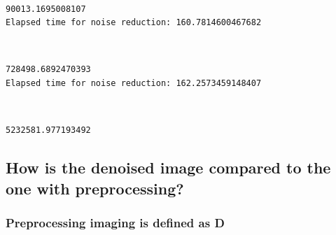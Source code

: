 \documentclass[11pt]{article}
\begin{document}
    \begin{center}
    \end{center}
    { \hspace*{\fill} \\}
    
    \begin{Verbatim}[commandchars=\\\{\}]
90013.1695008107
Elapsed time for noise reduction: 160.7814600467682

    \end{Verbatim}

    \begin{center}
    \end{center}
    { \hspace*{\fill} \\}
    
    \begin{Verbatim}[commandchars=\\\{\}]
728498.6892470393
Elapsed time for noise reduction: 162.2573459148407

    \end{Verbatim}

    \begin{center}
    \end{center}
    { \hspace*{\fill} \\}
    
    \begin{Verbatim}[commandchars=\\\{\}]
5232581.977193492

    \end{Verbatim}

    \subsection{How is the denoised image compared to the one with
preprocessing?}\label{how-is-the-denoised-image-compared-to-the-one-with-preprocessing}

\subsubsection{Preprocessing imaging is defined as
D}\label{preprocessing-imaging-is-defined-as-d}
\end{document}
